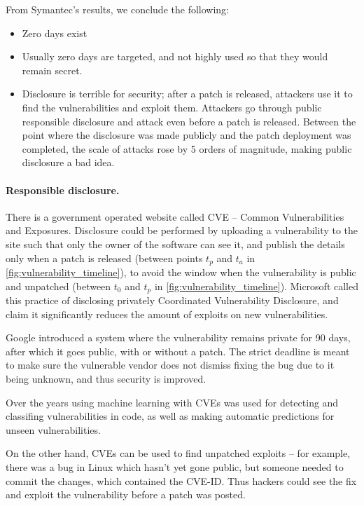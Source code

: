 From Symantec's results, we conclude the following:

\begin{itemize}
    \item Zero days exist
    \item Usually zero days are targeted, and not highly used so that they would
    remain secret.
    \item Disclosure is terrible for security; after a patch is released,
    attackers use it to find the vulnerabilities and exploit them. Attackers go
    through public responsible disclosure and attack even before a patch is
    released. Between the point where the disclosure was made publicly and the
    patch deployment was completed, the scale of attacks rose by 5 orders of
    magnitude, making public disclosure a bad idea.
\end{itemize}

\paragraph{Responsible disclosure.} There is a government operated website
called CVE – Common Vulnerabilities and Exposures. Disclosure could be performed
by uploading a vulnerability to the site such that only the owner of the
software can see it, and publish the details only when a patch is released
(between points $t_p$ and $t_a$ in \cref{fig:vulnerability_timeline}), to avoid
the window when the vulnerability is public and unpatched (between $t_0$ and
$t_p$ in \cref{fig:vulnerability_timeline}). Microsoft called this practice of
disclosing privately Coordinated Vulnerability Disclosure, and claim it
significantly reduces the amount of exploits on new vulnerabilities\cite{CVD}.

Google introduced a system\cite{googleDisclosure} where the vulnerability remains private for 90 days,
after which it goes public, with or without a patch. The strict deadline is
meant to make sure the vulnerable vendor does not dismiss fixing the bug due to
it being unknown, and thus security is improved.

Over the years using machine learning with CVEs was used for detecting and classifing vulnerabilities in code\cite{mokhov2010use}, 
as well as making automatic predictions for unseen vulnerabilities\cite{edkrantz2015predicting}.

On the other hand, CVEs can be used to find unpatched exploits – for example, there was a bug in Linux
which hasn't yet gone public, but someone needed to commit the changes, which
contained the CVE-ID. Thus hackers could see the fix and exploit the
vulnerability before a patch was posted.

